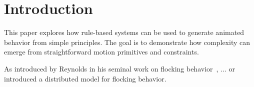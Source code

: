\section{Introduction}

This paper explores how rule-based systems can be used to generate animated behavior from simple principles. The goal is to demonstrate how complexity can emerge from straightforward motion primitives and constraints.

As introduced by Reynolds in his seminal work on flocking behavior~\cite{boids87}, ...
or 
\textcite{boids87} introduced a distributed model for flocking behavior.